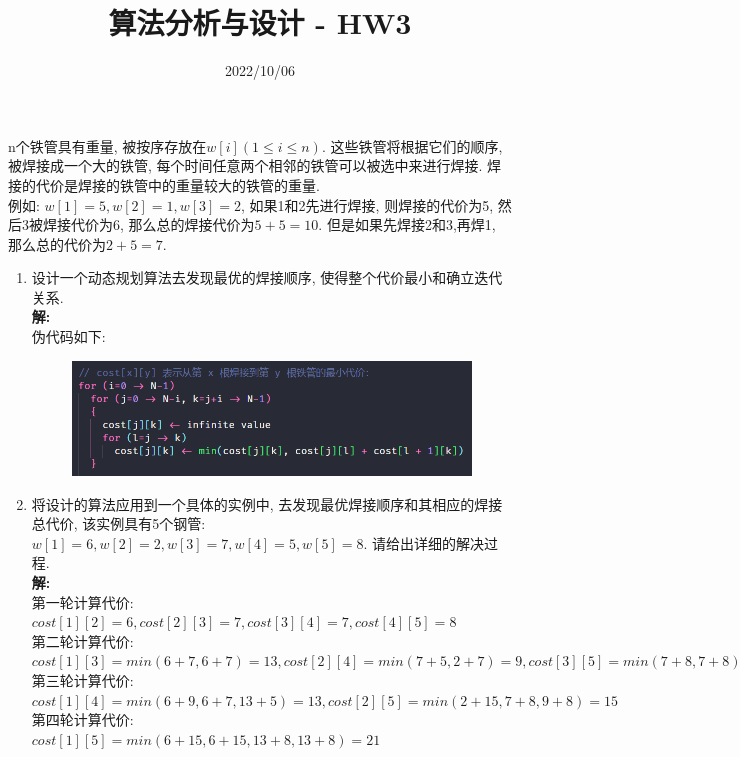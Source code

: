 \documentclass[a4paper]{ctexart}
\title{算法分析与设计 - HW3}
\author{}
\date{2022/10/06}
\begin{document}
\begin{sloppypar}

    \maketitle

    n个铁管具有重量, 被按序存放在$w[i] (1 \leq i \leq n)$.
    这些铁管将根据它们的顺序, 被焊接成一个大的铁管,
    每个时间任意两个相邻的铁管可以被选中来进行焊接.
    焊接的代价是焊接的铁管中的重量较大的铁管的重量. \\
    例如: $w[1]=5, w[2]=1, w[3]=2$, 如果1和2先进行焊接,
    则焊接的代价为5, 然后3被焊接代价为6, 那么总的焊接代价为$5 + 5=10$.
    但是如果先焊接2和3,再焊1, 那么总的代价为$2 + 5=7$.
    \begin{enumerate}[(1)]
        \item 设计一个动态规划算法去发现最优的焊接顺序,
              使得整个代价最小和确立迭代关系. \\
              \textbf{解:} \\
              伪代码如下:
              \begin{figure}[h]
                  \centering
                  \includegraphics[scale=0.8]{pseudo_code.png}
              \end{figure}

        \item 将设计的算法应用到一个具体的实例中,
              去发现最优焊接顺序和其相应的焊接总代价, 该实例具有5个钢管:
              $w[1]=6, w[2]=2, w[3]=7, w[4]=5, w[5]=8$.
              请给出详细的解决过程. \\
              \textbf{解:} \\
              第一轮计算代价: \\
              $cost[1][2]=6, cost[2][3]=7, cost[3][4]=7, cost[4][5]=8$ \\
              第二轮计算代价: \\
              $cost[1][3]=min(6+7, 6+7)=13, cost[2][4]=min(7+5, 2+7)=9, cost[3][5]=min(7+8, 7+8)=15$ \\
              第三轮计算代价: \\
              $cost[1][4]=min(6+9, 6+7, 13+5)=13, cost[2][5]=min(2+15, 7+8, 9+8)=15$
              第四轮计算代价: \\
              $cost[1][5]=min(6+15, 6+15, 13+8, 13+8)=21$
    \end{enumerate}

\end{sloppypar}
\end{document}
